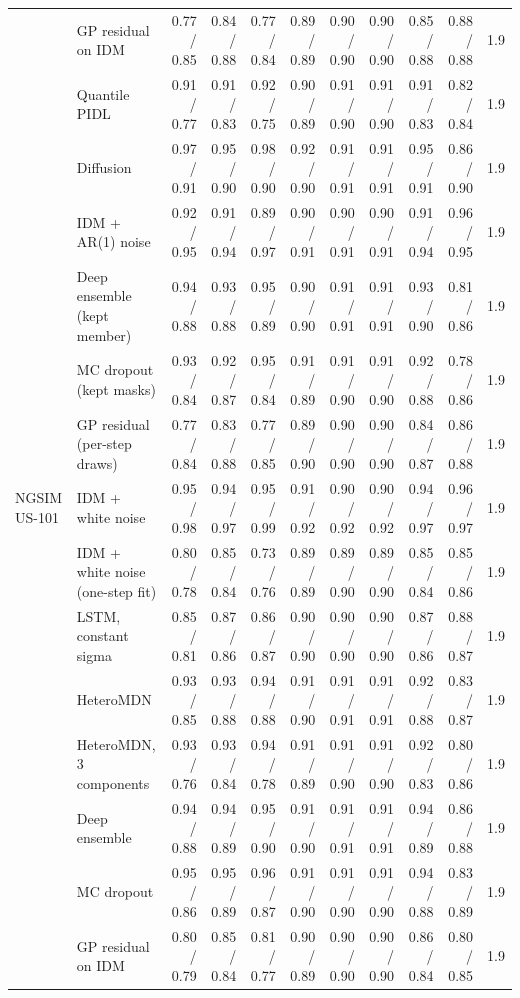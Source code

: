 \begin{longtable}{llrrrrrrrrr}
 & GP residual on IDM & 0.77 / 0.85 & 0.84 / 0.88 & 0.77 / 0.84 & 0.89 / 0.89 & 0.90 / 0.90 & 0.90 / 0.90 & 0.85 / 0.88 & 0.88 / 0.88 & 1.9 \\
 & Quantile PIDL & 0.91 / 0.77 & 0.91 / 0.83 & 0.92 / 0.75 & 0.90 / 0.89 & 0.91 / 0.90 & 0.91 / 0.90 & 0.91 / 0.83 & 0.82 / 0.84 & 1.9 \\
 & Diffusion & 0.97 / 0.91 & 0.95 / 0.90 & 0.98 / 0.90 & 0.92 / 0.90 & 0.91 / 0.91 & 0.91 / 0.91 & 0.95 / 0.91 & 0.86 / 0.90 & 1.9 \\
 & IDM + AR(1) noise & 0.92 / 0.95 & 0.91 / 0.94 & 0.89 / 0.97 & 0.90 / 0.91 & 0.90 / 0.91 & 0.90 / 0.91 & 0.91 / 0.94 & 0.96 / 0.95 & 1.9 \\
 & Deep ensemble (kept member) & 0.94 / 0.88 & 0.93 / 0.88 & 0.95 / 0.89 & 0.90 / 0.90 & 0.91 / 0.91 & 0.91 / 0.91 & 0.93 / 0.90 & 0.81 / 0.86 & 1.9 \\
 & MC dropout (kept masks) & 0.93 / 0.84 & 0.92 / 0.87 & 0.95 / 0.84 & 0.91 / 0.89 & 0.91 / 0.90 & 0.91 / 0.90 & 0.92 / 0.88 & 0.78 / 0.86 & 1.9 \\
 & GP residual (per-step draws) & 0.77 / 0.84 & 0.83 / 0.88 & 0.77 / 0.85 & 0.89 / 0.90 & 0.90 / 0.90 & 0.90 / 0.90 & 0.84 / 0.87 & 0.86 / 0.88 & 1.9 \\
\midrule
NGSIM US-101 & IDM + white noise & 0.95 / 0.98 & 0.94 / 0.97 & 0.95 / 0.99 & 0.91 / 0.92 & 0.90 / 0.92 & 0.90 / 0.92 & 0.94 / 0.97 & 0.96 / 0.97 & 1.9 \\
 & IDM + white noise (one-step fit) & 0.80 / 0.78 & 0.85 / 0.84 & 0.73 / 0.76 & 0.89 / 0.89 & 0.89 / 0.90 & 0.89 / 0.90 & 0.85 / 0.84 & 0.85 / 0.86 & 1.9 \\
 & LSTM, constant sigma & 0.85 / 0.81 & 0.87 / 0.86 & 0.86 / 0.87 & 0.90 / 0.90 & 0.90 / 0.90 & 0.90 / 0.90 & 0.87 / 0.86 & 0.88 / 0.87 & 1.9 \\
 & HeteroMDN & 0.93 / 0.85 & 0.93 / 0.88 & 0.94 / 0.88 & 0.91 / 0.90 & 0.91 / 0.91 & 0.91 / 0.91 & 0.92 / 0.88 & 0.83 / 0.87 & 1.9 \\
 & HeteroMDN, 3 components & 0.93 / 0.76 & 0.93 / 0.84 & 0.94 / 0.78 & 0.91 / 0.89 & 0.91 / 0.90 & 0.91 / 0.90 & 0.92 / 0.83 & 0.80 / 0.86 & 1.9 \\
 & Deep ensemble & 0.94 / 0.88 & 0.94 / 0.89 & 0.95 / 0.90 & 0.91 / 0.90 & 0.91 / 0.91 & 0.91 / 0.91 & 0.94 / 0.89 & 0.86 / 0.88 & 1.9 \\
 & MC dropout & 0.95 / 0.86 & 0.95 / 0.89 & 0.96 / 0.87 & 0.91 / 0.90 & 0.91 / 0.90 & 0.91 / 0.90 & 0.94 / 0.88 & 0.83 / 0.89 & 1.9 \\
 & GP residual on IDM & 0.80 / 0.79 & 0.85 / 0.84 & 0.81 / 0.77 & 0.90 / 0.89 & 0.90 / 0.90 & 0.90 / 0.90 & 0.86 / 0.84 & 0.80 / 0.85 & 1.9 \\

\end{longtable}

